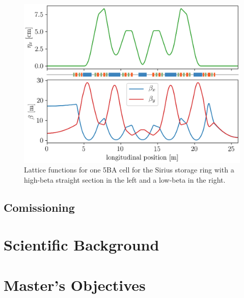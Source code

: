 \begin{figure}
    \centering
    \includegraphics[scale=1.0]{figures/twiss_plot_refine.eps}
    \caption{Lattice functions for one 5BA cell for the Sirius storage ring with a high-beta straight section in the left and a low-beta in the right.}
    \label{fig:twiss_functions}
\end{figure}

\subsection{Comissioning}
\section{Scientific Background}
\section{Master's Objectives}






